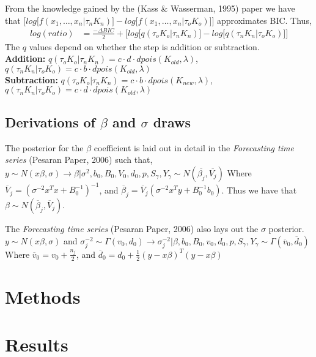 \documentclass[submit]{smj}
\begin{document}
From the knowledge gained by the (Kass $\&$ Wasserman, 1995) paper we have that $\Big[ log \big[ f(x_1,\dots,x_n | \tau_{n} K_{n}) \big] -  log \big[ f(x_1,\dots,x_n | \tau_{o} K_{o})\big] \Big] $ approximates BIC. Thus,
\begin{align*}
log(ratio) &= \frac{- \Delta BIC}{2} + 
\Big[ log \big[ q(\tau_{o} K_{o} | \tau_{n} K_{n}) \big] - log \big[ q(\tau_{n} K_{n}| \tau_{o} K_{o})  \big] \Big]
\end{align*}
The $q$ values depend on whether the step is addition or subtraction. \\
\textbf{Addition:} 
$q(\tau_{o} K_{o} | \tau_{n} K_{n}) = c \cdot d \cdot dpois(K_{old} , \lambda)$, $q(\tau_{n} K_{n} | \tau_{o} K_{o}) = c \cdot b \cdot dpois(K_{old} , \lambda)$
\\
\textbf{Subtraction:}
$q(\tau_{o} K_{o} | \tau_{n} K_{n}) = c \cdot b \cdot dpois(K_{new} , \lambda)$, $q(\tau_{n} K_{n} | \tau_{o} K_{o}) = c \cdot d \cdot dpois(K_{old} , \lambda)$ \\


\subsection{Derivations of $\beta$ and $\sigma$ draws}

The posterior for the $\beta$ coefficient is laid out in detail in the \textit{Forecasting time series} (Pesaran Paper, 2006) such that,  $y \sim  N(x \beta , \sigma ) \longrightarrow \beta | \sigma^2, b_0, B_0, V_0, d_0, p , S_{\gamma}, Y_{\gamma} \sim N( \overline{\beta_j } , \overline{V_j} )$
Where $\overline{V}_j = (\sigma^{-2}x^Tx + B_0^{-1})^{-1}$, and $\overline{\beta}_j = \overline{V}_j(\sigma^{-2}x^Ty + B_0^{-1}b_0)$. Thus we have that $\beta  \sim N(\overline{\beta}_j, \overline{V}_j)$. 

The \textit{Forecasting time series} (Pesaran Paper, 2006) also lays out the $\sigma$ posterior. $y \sim N(x \beta , \sigma )$ and $\sigma_j^{-2} \sim  \Gamma(v_0, d_0) \longrightarrow \sigma^{-2}_j | \beta, b_0, B_0, v_0, d_0, p , S_{\gamma}, Y_{\gamma} \sim \Gamma ( \overline{v}_0,  \overline{d}_0) $
Where $\overline{v}_0 = v_0 + \frac{n_j}{2}$, and $\overline{d}_0 = d_0 + \frac{1}{2}(y-x\beta)^T(y-x\beta)$


\section{Methods}

\section{Results}
\end{document}
